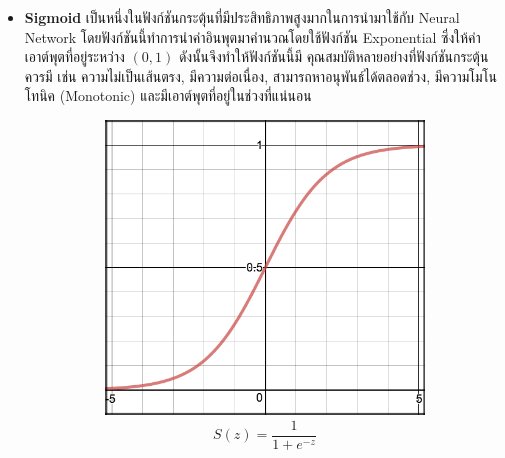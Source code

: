 \begin{itemize}
    \item \textbf{Sigmoid}\autocite{wilson1972} เป็นหนึ่งในฟังก์ชันกระตุ้นที่มีประสิทธิภาพสูงมากในการนำมาใช้กับ Neural Network 
    โดยฟังก์ชันนี้ทำการนำค่าอินพุตมาคำนวณโดยใช้ฟังก์ชัน Exponential ซึ่งให้ค่าเอาต์พุตที่อยู่ระหว่าง $(0, 1)$ ดังนั้นจึงทำให้ฟังก์ชันนี้มี%
    คุณสมบัติหลายอย่างที่ฟังก์ชันกระตุ้นควรมี เช่น ความไม่เป็นเส้นตรง, มีความต่อเนื่อง, สามารถหาอนุพันธ์ได้ตลอดช่วง, มีความโมโนโทนิค 
    (Monotonic) และมีเอาต์พุตที่อยู่ในช่วงที่แน่นอน
    \begin{figure}[htbp]
        \centering
        \begin{subfigure}{0.5\textwidth}
            \centering
            \includegraphics[width=0.9\linewidth]{fig/actfunc_sigmoid.png}
            \caption{%
                \begin{equation}
                    S(z) = \frac{1} {1 + e^{-z}}
                \end{equation}
            }
            \label{fig:actfunc_sigmoid}
        \end{subfigure}%
        \begin{subfigure}{0.5\textwidth}
            \centering

\end{subfigure}
\end{figure}
\end{itemize}
